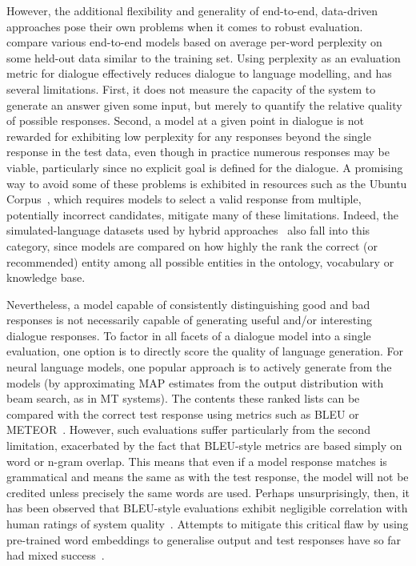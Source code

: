 \documentclass[11pt,letterpaper]{article}
\begin{document}
However, the additional flexibility and generality of end-to-end, data-driven approaches pose their own problems when it comes to robust evaluation.~ compare various end-to-end models based on average per-word perplexity on some held-out data similar to the training set. Using perplexity as an evaluation metric for dialogue effectively reduces dialogue to language modelling, and has several limitations. First, it does not measure the capacity of the system to generate an answer given some input, but merely to quantify the relative quality of possible responses. Second, a model at a given point in dialogue is not rewarded for exhibiting low perplexity for any responses beyond the single response in the test data, even though in practice numerous responses may be viable, particularly since no explicit goal is defined for the dialogue.  A promising way to avoid some of these problems is exhibited in resources such as the Ubuntu Corpus~\cite{lowe2015ubuntu}, which requires models to select a valid response from multiple, potentially incorrect candidates, mitigate many of these limitations. Indeed, the simulated-language datasets used by hybrid approaches~\cite{weston2015towards,bordes2016learning,dodge2015evaluating} also fall into this category, since models are compared on how highly the rank the correct (or recommended) entity among all possible entities in the ontology, vocabulary or knowledge base. 

Nevertheless, a model capable of consistently distinguishing good and bad responses is not necessarily capable of generating useful and/or interesting dialogue responses. To factor in all facets of a dialogue model into a single evaluation, one option is to directly score the quality of language generation. For neural language models, one popular approach is to actively generate from the models (by approximating MAP estimates from the output distribution with beam search, as in MT systems). The contents these ranked lists can be compared with the correct test response using metrics such as BLEU or METEOR~\cite{li2015diversity,li2016persona}. However, such evaluations suffer particularly from the second limitation, exacerbated by the fact that BLEU-style metrics are based simply on word or n-gram overlap. This means that even if a model response matches is grammatical and means the same as with the test response, the model will not be credited unless precisely the same words are used. Perhaps unsurprisingly, then, it has been observed that BLEU-style evaluations exhibit negligible correlation with human ratings of system quality~\cite{liu2016not}. Attempts to mitigate this critical flaw by using pre-trained word embeddings to generalise output and test responses have so far had mixed success~\cite{liu2016not}.
\end{document}
